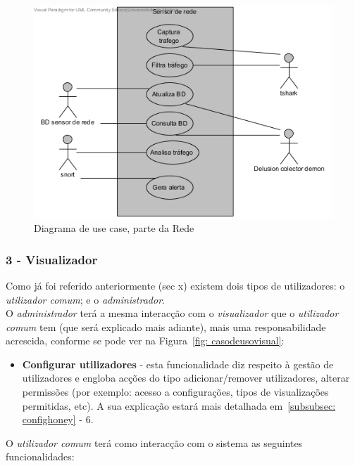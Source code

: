 \begin{figure}[!htb]
	\centering
	\includegraphics[scale=0.80]{images/ucs/Rede}
	\caption {Diagrama de use case, parte da Rede}
\end{figure}
\pagebreak

\newcommand{\uticomum}{\emph{utilizador comum}\xspace} 
\newcommand{\admini}{\emph{administrador}\xspace} 
\newcommand{\visualz}{\emph{visualizador}\xspace}
\subsubsection{\textbf{3 - Visualizador}}

Como já foi referido anteriormente (sec x) existem dois tipos de utilizadores: o \uticomum; e o \admini.\\ 

O \admini terá a mesma interacção com o \visualz que o \uticomum tem (que será explicado mais adiante), mais uma responsabilidade acrescida, 
conforme se pode ver na Figura~\ref{fig: casodeusovisual}:

\begin{itemize}
 \item \textbf{Configurar utilizadores} - esta funcionalidade diz respeito à gestão de utilizadores e engloba acções do tipo adicionar/remover utilizadores, 
 alterar permissões (por exemplo: acesso a configurações, tipos de visualizações permitidas, etc). A sua explicação estará mais detalhada em~\ref{subsubsec: confighoney} - 6.
\end{itemize}

O \uticomum terá como interacção com o sistema as seguintes funcionalidades:

